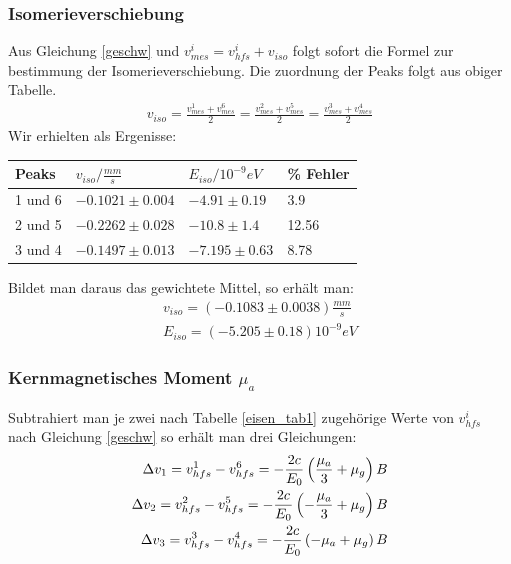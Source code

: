 \documentclass[12pt]{article}
\begin{document}
\subsubsection{Isomerieverschiebung}
Aus Gleichung \ref{geschw} und $v_{mes}^i = v_{hfs}^i + v_{iso}$ folgt sofort die Formel zur bestimmung der Isomerieverschiebung. Die zuordnung 
der Peaks folgt aus obiger Tabelle.
\begin{align*}
 v_{iso} = \frac{v_{mes}^1+v_{mes}^6}{2} =\frac{v_{mes}^2+v_{mes}^5}{2} =\frac{v_{mes}^3+v_{mes}^4}{2}
\end{align*}
Wir erhielten als Ergenisse: \\
\newline
\begin{center}
\begin{tabular}{|l|lll|}
\hline
Peaks & $v_{iso}/\frac{mm}{s}$ & $E_{iso}/10^{-9}eV$ & \% Fehler\\
\hline
1 und 6& $-0.1021 \pm 0.004$ & $-4.91 \pm 0.19$ & 3.9\\
2 und 5& $-0.2262 \pm 0.028$ & $-10.8 \pm 1.4$ & 12.56\\
3 und 4& $-0.1497 \pm 0.013$ & $-7.195 \pm 0.63$ & 8.78\\
\hline
\end{tabular}
\label{eisen_tabiso}
\end{center}

Bildet man daraus das gewichtete Mittel, so erhält man:
\begin{align*}
 v_{iso} = (-0.1083\pm 0.0038)\frac{mm}{s} \\
 E_{iso} = (-5.205 \pm 0.18)10^{-9} eV
\end{align*}

\subsubsection[Kernmagnetisches Moment]{Kernmagnetisches Moment $\mu_a$}
Subtrahiert man je zwei nach Tabelle \ref{eisen_tab1} zugehörige Werte von $v_{hfs}^i$ nach Gleichung \ref{geschw} so erhält man drei Gleichungen:
\begin{align}
 \notag \Delta v_1=v_{hfs}^1 - v_{hfs}^6 = -\frac{2c}{E_0} \left( \frac{\mu_a}{3} + \mu_g \right) B \\
 \Delta v_2=v_{hfs}^2 - v_{hfs}^5 = -\frac{2c}{E_0} \left( -\frac{\mu_a}{3} + \mu_g \right) B \\
 \notag \Delta v_3=v_{hfs}^3 - v_{hfs}^4 = -\frac{2c}{E_0} \left( -\mu_a + \mu_g \right) B 
\end{align}
\label{diff_geschw}
\end{document}
